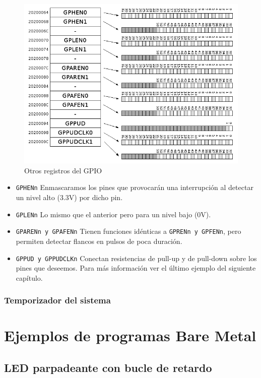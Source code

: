 \begin{figure}[h]
  \centering
    \includegraphics[width=14cm]{graphs/gpio3.png}
  \caption{Otros registros del GPIO}
  \label{fig:gpio3}
\end{figure}

\begin{itemize}
  \item {\tt GPHENn} Enmascaramos los pines que provocarán una interrupción al detectar un
        nivel alto (3.3V) por dicho pin.
  \item {\tt GPLENn} Lo mismo que el anterior pero para un nivel bajo (0V).
  \item {\tt GPARENn y GPAFENn} Tienen funciones idénticas a {\tt GPRENn y GPFENn}, pero permiten
        detectar flancos en pulsos de poca duración.
  \item {\tt GPPUD y GPPUDCLKn} Conectan resistencias de pull-up y de pull-down sobre los pines
        que deseemos. Para más información ver el último ejemplo del siguiente capítulo.
\end{itemize}

\subsubsection{Temporizador del sistema}


\section{Ejemplos de programas Bare Metal}

\subsection{LED parpadeante con bucle de retardo}

